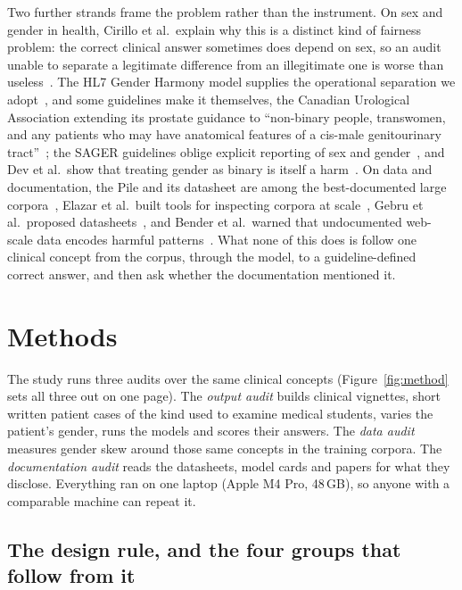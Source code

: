 \documentclass[11pt,twocolumn]{article}
\begin{document}
Two further strands frame the problem rather than the instrument. On sex and
gender in health, Cirillo et al.\ explain why this is a distinct kind of fairness
problem: the correct clinical answer sometimes does depend on sex, so an audit
unable to separate a legitimate difference from an illegitimate one is worse than
useless~\cite{r11}. The HL7 Gender Harmony model supplies the operational
separation we adopt~\cite{r2}, and some guidelines make it themselves, the
Canadian Urological Association extending its prostate guidance to ``non-binary
people, transwomen, and any patients who may have anatomical features of a
cis-male genitourinary tract''~\cite{r25}; the SAGER guidelines oblige explicit
reporting of sex and gender~\cite{r3}, and Dev et al.\ show that treating gender
as binary is itself a harm~\cite{r10}. On data and documentation, the Pile and
its datasheet are among the best-documented large corpora~\cite{r4,r17}, Elazar
et al.\ built tools for inspecting corpora at scale~\cite{r5}, Gebru et al.\
proposed datasheets~\cite{r1}, and Bender et al.\ warned that undocumented
web-scale data encodes harmful patterns~\cite{r16}. What none of this does is
follow one clinical concept from the corpus, through the model, to a
guideline-defined correct answer, and then ask whether the documentation
mentioned it.

\section{Methods}

The study runs three audits over the same clinical concepts
(Figure~\ref{fig:method} sets all three out on one page). The \emph{output
audit} builds clinical vignettes, short written patient cases of the kind used to
examine medical students, varies the patient's gender, runs the models and scores
their answers. The \emph{data audit} measures gender skew around those same
concepts in the training corpora. The \emph{documentation audit} reads the
datasheets, model cards and papers for what they disclose. Everything ran on one
laptop (Apple M4 Pro, 48\,GB), so anyone with a comparable machine can repeat it.


\subsection{The design rule, and the four groups that follow from it}
\end{document}
